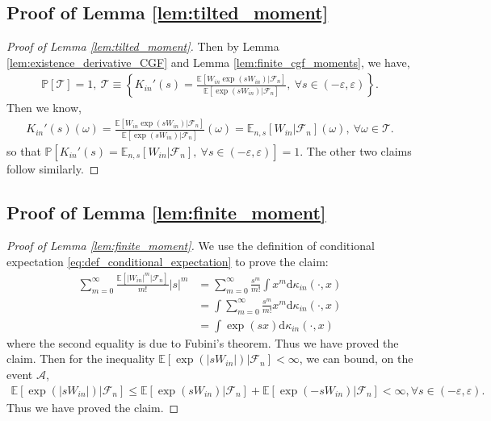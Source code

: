 \documentclass[12pt]{article}
\theoremstyle{definition}
\def\P{\mathbb{P}}
\def\P{\mathbb{P}}
\newcommand{\E}{\mathbb E}								%
\renewcommand{\P}{\mathbb{P}}							%
\begin{document}
\subsection{Proof of Lemma \ref{lem:tilted_moment}}

\begin{proof}[Proof of Lemma \ref{lem:tilted_moment}]
	Then by Lemma \ref{lem:existence_derivative_CGF} and Lemma \ref{lem:finite_cgf_moments}, we have,
	\begin{align*}
		\P\left[\mathcal{T}\right]=1,\ \mathcal{T}\equiv \left\{K_{in}'(s)=\frac{\E[W_{in}\exp(sW_{in})|\mathcal{F}_n]}{\E[\exp(sW_{in})|\mathcal{F}_n]},\ \forall s\in (-\varepsilon,\varepsilon)\right\}.
	\end{align*}
	Then we know,
	\begin{align*}
		K_{in}'(s)(\omega)=\frac{\E[W_{in}\exp(sW_{in})|\mathcal{F}_n]}{\E[\exp(sW_{in})|\mathcal{F}_n]}(\omega)=\E_{n,s}[W_{in}|\mathcal{F}_n](\omega),\ \forall \omega\in\mathcal{T}.
	\end{align*}
	so that $\P\left[K_{in}'(s)=\E_{n,s}[W_{in}|\mathcal{F}_n],\ \forall s\in (-\varepsilon,\varepsilon)\right]=1$. The other two claims follow similarly.
\end{proof}

	\subsection{Proof of Lemma \ref{lem:finite_moment}}

	\begin{proof}[Proof of Lemma \ref{lem:finite_moment}]
		We use the definition of conditional expectation \eqref{eq:def_conditional_expectation} to prove the claim:
		\begin{align*}
			\sum_{m=0}^{\infty}\frac{\E[|W_{in}|^m|\mathcal{F}_n]}{m!}|s|^m
			&
			=\sum_{m=0}^{\infty}\frac{s^m}{m!}\int x^m \mathrm{d}\kappa_{in}(\cdot,x)\\
			&
			=\int \sum_{m=0}^{\infty}\frac{s^m}{m!} x^m \mathrm{d}\kappa_{in}(\cdot,x)\\
			&
			=\int \exp(sx)\mathrm{d}\kappa_{in}(\cdot,x)
		\end{align*}
		where the second equality is due to Fubini's theorem. Thus we have proved the claim. Then for the inequality $\E[\exp(|sW_{in}|)|\mathcal{F}_n]<\infty$, we can bound, on the event $\mathcal{A}$,
		\begin{align*}
			\E[\exp(|sW_{in}|)|\mathcal{F}_n]\leq \E[\exp(sW_{in})|\mathcal{F}_n]+\E[\exp(-sW_{in})|\mathcal{F}_n]<\infty, \forall s\in (-\varepsilon,\varepsilon).
		\end{align*}
		Thus we have proved the claim.
	\end{proof}
\end{document}
